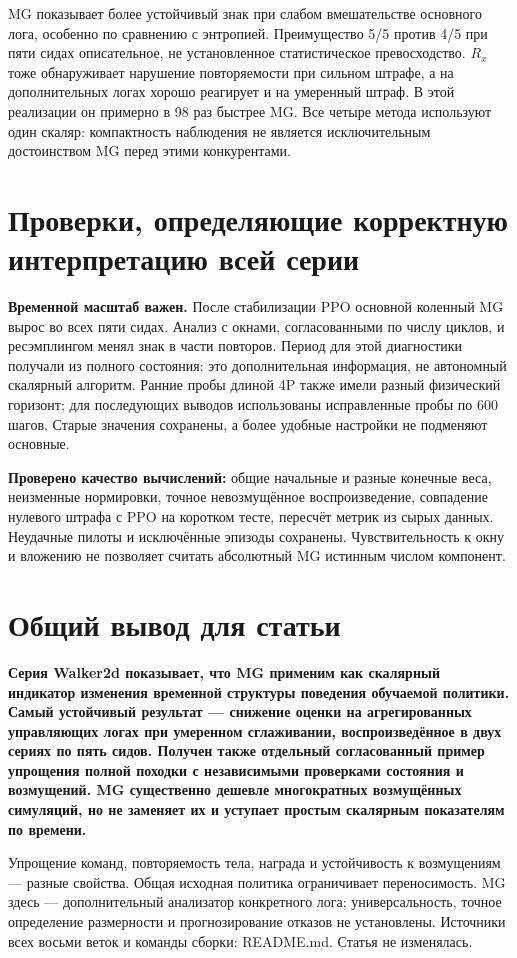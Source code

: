 \documentclass[10pt,a4paper]{article}
\begin{document}
MG показывает более устойчивый знак при слабом вмешательстве основного лога, особенно по сравнению с энтропией. Преимущество 5/5 против 4/5 при пяти сидах описательное, не установленное статистическое превосходство. $R_x$ тоже обнаруживает нарушение повторяемости при сильном штрафе, а на дополнительных логах хорошо реагирует и на умеренный штраф. В этой реализации он примерно в 98 раз быстрее MG. Все четыре метода используют один скаляр: компактность наблюдения не является исключительным достоинством MG перед этими конкурентами.

\section*{Проверки, определяющие корректную интерпретацию всей серии}

\textbf{Временной масштаб важен.} После стабилизации PPO основной коленный MG вырос во всех пяти сидах. Анализ с окнами, согласованными по числу циклов, и ресэмплингом менял знак в части повторов. Период для этой диагностики получали из полного состояния: это дополнительная информация, не автономный скалярный алгоритм. Ранние пробы длиной 4P также имели разный физический горизонт; для последующих выводов использованы исправленные пробы по 600 шагов. Старые значения сохранены, а более удобные настройки не подменяют основные.

\textbf{Проверено качество вычислений:} общие начальные и разные конечные веса, неизменные нормировки, точное невозмущённое воспроизведение, совпадение нулевого штрафа с PPO на коротком тесте, пересчёт метрик из сырых данных. Неудачные пилоты и исключённые эпизоды сохранены. Чувствительность к окну и вложению не позволяет считать абсолютный MG истинным числом компонент.

\section*{Общий вывод для статьи}

\textbf{Серия Walker2d показывает, что MG применим как скалярный индикатор изменения временной структуры поведения обучаемой политики. Самый устойчивый результат --- снижение оценки на агрегированных управляющих логах при умеренном сглаживании, воспроизведённое в двух сериях по пять сидов. Получен также отдельный согласованный пример упрощения полной походки с независимыми проверками состояния и возмущений. MG существенно дешевле многократных возмущённых симуляций, но не заменяет их и уступает простым скалярным показателям по времени.}

Упрощение команд, повторяемость тела, награда и устойчивость к возмущениям --- разные свойства. Общая исходная политика ограничивает переносимость. MG здесь --- дополнительный анализатор конкретного лога; универсальность, точное определение размерности и прогнозирование отказов не установлены. Источники всех восьми веток и команды сборки: README.md. Статья не изменялась.
\end{document}
